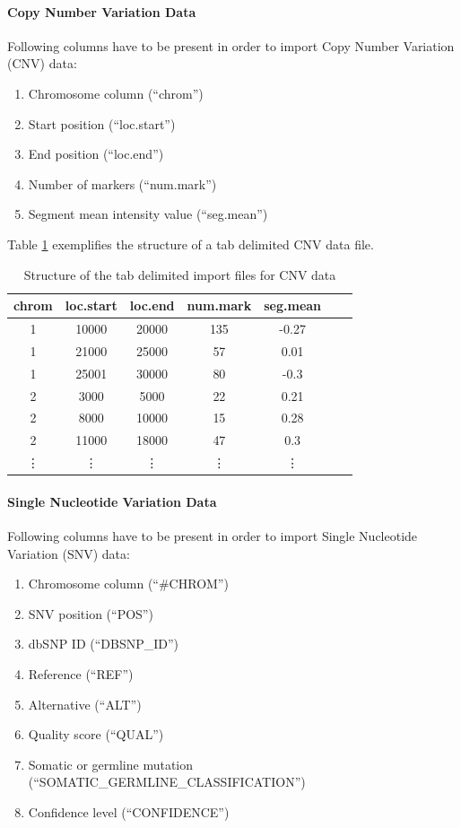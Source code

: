 \documentclass[11pt,final]{article}
\begin{document}
\paragraph{Copy Number Variation Data}

Following columns have to be present in order to import Copy Number Variation
(CNV) data:

\begin{enumerate}
  \item Chromosome column (``chrom'')
  \item Start position (``loc.start'')
  \item End position (``loc.end'')
  \item Number of markers (``num.mark'')
  \item Segment mean intensity value (``seg.mean'')
\end{enumerate}

Table \ref{tab:tsv_cnv} exemplifies the structure of a tab delimited CNV data file.

\begin{table}
	\centering
	\begin{tabular}[h]{|c|c|c|c|c|c|c|}
	  \hline
	 chrom & loc.start & loc.end & num.mark & seg.mean \\ \hline
	 1 & 10000 & 20000 & 135 & -0.27 \\
	 1 & 21000 & 25000 & 57 & 0.01 \\
	 1 & 25001 & 30000 & 80 & -0.3 \\
	 2 & 3000 & 5000 & 22 & 0.21 \\
	 2 & 8000 & 10000 & 15 & 0.28 \\
	 2 & 11000 & 18000 & 47 & 0.3 \\
	 \vdots & \vdots & \vdots & \vdots & \vdots \\
	\end{tabular}
	\caption{Structure of the tab delimited import files for CNV data}
	\label{tab:tsv_cnv}
\end{table}

\paragraph{Single Nucleotide Variation Data}

Following columns have to be present in order to import Single Nucleotide
Variation (SNV) data:

\begin{enumerate}
  \item Chromosome column (``\#CHROM'')
  \item SNV position (``POS'')
  \item dbSNP ID (``DBSNP\_ID'')
  \item Reference (``REF'')
  \item Alternative (``ALT'')
  \item Quality score (``QUAL'')
  \item Somatic or germline mutation (``SOMATIC\_GERMLINE\_CLASSIFICATION'')
  \item Confidence level (``CONFIDENCE'')
\end{enumerate}
\end{document}
